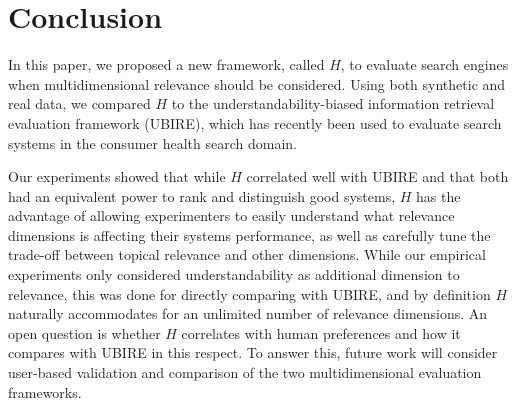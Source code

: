 
\section{Conclusion}
\label{sec:conclusion}

In this paper, we proposed a new framework, called $H$, to evaluate search engines when multidimensional relevance should be considered.
Using both synthetic and real data, we compared $H$ to the understandability-biased information retrieval evaluation framework (UBIRE), which has recently been used  to evaluate search systems in the consumer health search domain. 

Our experiments showed that while $H$ correlated well with UBIRE and that both had an equivalent power to rank and distinguish good systems, $H$ has the advantage of allowing experimenters to easily understand what relevance dimensions is affecting their systems performance, as well as carefully tune the trade-off between topical relevance and other dimensions. While our empirical experiments only considered understandability as additional dimension to relevance, this was done for directly comparing with UBIRE, and by definition $H$ naturally accommodates for an unlimited number of relevance dimensions. An open question is whether $H$ correlates with human preferences and how it compares with UBIRE in this respect. To answer this, future work will consider user-based validation and comparison of the two multidimensional evaluation frameworks. 
